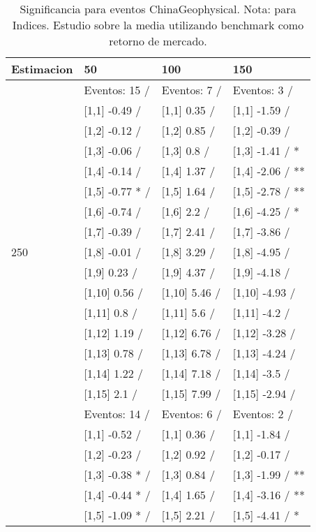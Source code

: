 \begin{table}

\caption{Significancia para eventos ChinaGeophysical. Nota: para Indices. Estudio sobre la media utilizando benchmark como retorno de mercado.}
\centering
\begin{tabular}[t]{llll}
\toprule
Estimacion & 50 & 100 & 150\\
\midrule
 & Eventos:  15 / & Eventos:  7 / & Eventos:  3 /\\
 & {}[1,1] -0.49  / & {}[1,1] 0.35  / & {}[1,1] -1.59  /\\
 & {}[1,2] -0.12  / & {}[1,2] 0.85  / & {}[1,2] -0.39  /\\
 & {}[1,3] -0.06  / & {}[1,3] 0.8  / & {}[1,3] -1.41  / *\\
 & {}[1,4] -0.14  / & {}[1,4] 1.37  / & {}[1,4] -2.06  / **\\
\addlinespace
 & {}[1,5] -0.77 * / & {}[1,5] 1.64  / & {}[1,5] -2.78  / **\\
 & {}[1,6] -0.74  / & {}[1,6] 2.2  / & {}[1,6] -4.25  / *\\
 & {}[1,7] -0.39  / & {}[1,7] 2.41  / & {}[1,7] -3.86  /\\
250 & {}[1,8] -0.01  / & {}[1,8] 3.29  / & {}[1,8] -4.95  /\\
 & {}[1,9] 0.23  / & {}[1,9] 4.37  / & {}[1,9] -4.18  /\\
\addlinespace
 & {}[1,10] 0.56  / & {}[1,10] 5.46  / & {}[1,10] -4.93  /\\
 & {}[1,11] 0.8  / & {}[1,11] 5.6  / & {}[1,11] -4.2  /\\
 & {}[1,12] 1.19  / & {}[1,12] 6.76  / & {}[1,12] -3.28  /\\
 & {}[1,13] 0.78  / & {}[1,13] 6.78  / & {}[1,13] -4.24  /\\
 & {}[1,14] 1.22  / & {}[1,14] 7.18  / & {}[1,14] -3.5  /\\
\addlinespace
 & {}[1,15] 2.1  / & {}[1,15] 7.99  / & {}[1,15] -2.94  /\\
 & Eventos:  14 / & Eventos:  6 / & Eventos:  2 /\\
 & {}[1,1] -0.52  / & {}[1,1] 0.36  / & {}[1,1] -1.84  /\\
 & {}[1,2] -0.23  / & {}[1,2] 0.92  / & {}[1,2] -0.17  /\\
 & {}[1,3] -0.38 * / & {}[1,3] 0.84  / & {}[1,3] -1.99  / **\\
\addlinespace
 & {}[1,4] -0.44 * / & {}[1,4] 1.65  / & {}[1,4] -3.16  / **\\
 & {}[1,5] -1.09 * / & {}[1,5] 2.21  / & {}[1,5] -4.41  / *\\

\end{tabular}
\end{table}
